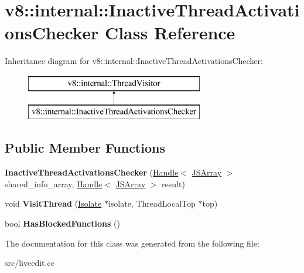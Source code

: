 \hypertarget{classv8_1_1internal_1_1_inactive_thread_activations_checker}{}\section{v8\+:\+:internal\+:\+:Inactive\+Thread\+Activations\+Checker Class Reference}
\label{classv8_1_1internal_1_1_inactive_thread_activations_checker}
Inheritance diagram for v8\+:\+:internal\+:\+:Inactive\+Thread\+Activations\+Checker\+:\begin{figure}[H]
\begin{center}
\leavevmode
\includegraphics[height=2.000000cm]{classv8_1_1internal_1_1_inactive_thread_activations_checker}
\end{center}
\end{figure}
\subsection*{Public Member Functions}
\begin{DoxyCompactItemize}
\item 
\hypertarget{classv8_1_1internal_1_1_inactive_thread_activations_checker_af3aa13330f00321ccde116ea5edd3cef}{}{\bfseries Inactive\+Thread\+Activations\+Checker} (\hyperlink{classv8_1_1internal_1_1_handle}{Handle}$<$ \hyperlink{classv8_1_1internal_1_1_j_s_array}{J\+S\+Array} $>$ shared\+\_\+info\+\_\+array, \hyperlink{classv8_1_1internal_1_1_handle}{Handle}$<$ \hyperlink{classv8_1_1internal_1_1_j_s_array}{J\+S\+Array} $>$ result)\label{classv8_1_1internal_1_1_inactive_thread_activations_checker_af3aa13330f00321ccde116ea5edd3cef}

\item 
\hypertarget{classv8_1_1internal_1_1_inactive_thread_activations_checker_a15193de7d26efb218fb033844f3e3f30}{}void {\bfseries Visit\+Thread} (\hyperlink{classv8_1_1internal_1_1_isolate}{Isolate} $\ast$isolate, Thread\+Local\+Top $\ast$top)\label{classv8_1_1internal_1_1_inactive_thread_activations_checker_a15193de7d26efb218fb033844f3e3f30}

\item 
\hypertarget{classv8_1_1internal_1_1_inactive_thread_activations_checker_a00e3f278075d637296a226c702904aec}{}bool {\bfseries Has\+Blocked\+Functions} ()\label{classv8_1_1internal_1_1_inactive_thread_activations_checker_a00e3f278075d637296a226c702904aec}

\end{DoxyCompactItemize}


The documentation for this class was generated from the following file\+:\begin{DoxyCompactItemize}
\item 
src/liveedit.\+cc\end{DoxyCompactItemize}
